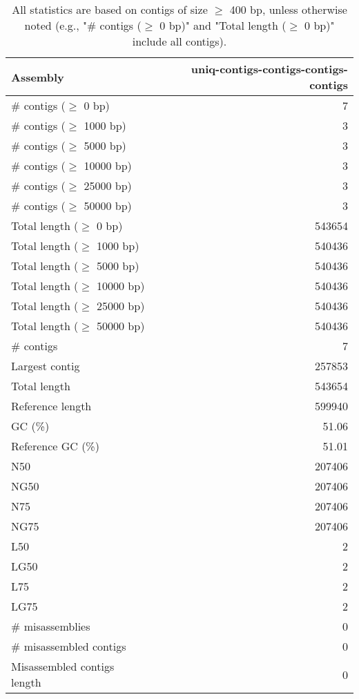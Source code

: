 \documentclass[12pt,a4paper]{article}
\begin{document}
\begin{table}[ht]
\begin{center}
\caption{All statistics are based on contigs of size $\geq$ 400 bp, unless otherwise noted (e.g., "\# contigs ($\geq$ 0 bp)" and "Total length ($\geq$ 0 bp)" include all contigs).}
\begin{tabular}{|l*{1}{|r}|}
\hline
Assembly & uniq-contigs-contigs-contigs-contigs \\ \hline
\# contigs ($\geq$ 0 bp) & 7 \\ \hline
\# contigs ($\geq$ 1000 bp) & 3 \\ \hline
\# contigs ($\geq$ 5000 bp) & 3 \\ \hline
\# contigs ($\geq$ 10000 bp) & 3 \\ \hline
\# contigs ($\geq$ 25000 bp) & 3 \\ \hline
\# contigs ($\geq$ 50000 bp) & 3 \\ \hline
Total length ($\geq$ 0 bp) & 543654 \\ \hline
Total length ($\geq$ 1000 bp) & 540436 \\ \hline
Total length ($\geq$ 5000 bp) & 540436 \\ \hline
Total length ($\geq$ 10000 bp) & 540436 \\ \hline
Total length ($\geq$ 25000 bp) & 540436 \\ \hline
Total length ($\geq$ 50000 bp) & 540436 \\ \hline
\# contigs & 7 \\ \hline
Largest contig & 257853 \\ \hline
Total length & 543654 \\ \hline
Reference length & 599940 \\ \hline
GC (\%) & 51.06 \\ \hline
Reference GC (\%) & 51.01 \\ \hline
N50 & 207406 \\ \hline
NG50 & 207406 \\ \hline
N75 & 207406 \\ \hline
NG75 & 207406 \\ \hline
L50 & 2 \\ \hline
LG50 & 2 \\ \hline
L75 & 2 \\ \hline
LG75 & 2 \\ \hline
\# misassemblies & 0 \\ \hline
\# misassembled contigs & 0 \\ \hline
Misassembled contigs length & 0 \\ \hline

\end{tabular}
\end{center}
\end{table}
\end{document}
